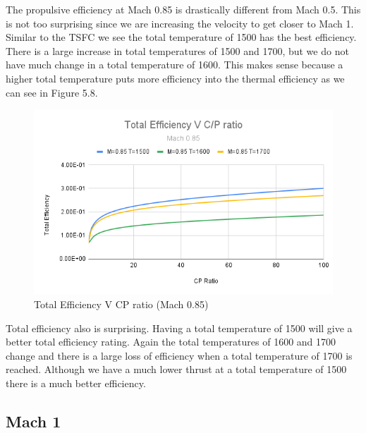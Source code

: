\documentclass[12pt]{report}
\begin{document}
The propulsive efficiency at Mach 0.85 is drastically different from Mach 0.5.  This is not too surprising since we are increasing the velocity to get closer to Mach 1. Similar to the TSFC we see the total temperature of 1500 has the best efficiency. There is a large increase in total temperatures of 1500 and 1700, but we do not have much change in a total temperature of 1600. This makes sense because a higher total temperature puts more efficiency into the thermal efficiency as we can see in Figure 5.8.



\begin{figure}[H]
    \centering
    \includegraphics[width=15.5 cm]{Total Efficiency V C_P ratio (Mach 0.85).png}
    \caption{Total Efficiency V CP ratio (Mach 0.85)}
    \label{fig:Total Efficiency V CP ratio (Mach 0.85)}
\end{figure}


Total efficiency also is surprising.  Having a total temperature of 1500 will give a better total efficiency rating.  Again the total temperatures of 1600 and 1700 change and there is a large loss of efficiency when a total temperature of 1700 is reached. Although we have a much lower thrust at a total temperature of 1500 there is a much better efficiency.


\subsection{Mach 1}
\end{document}
